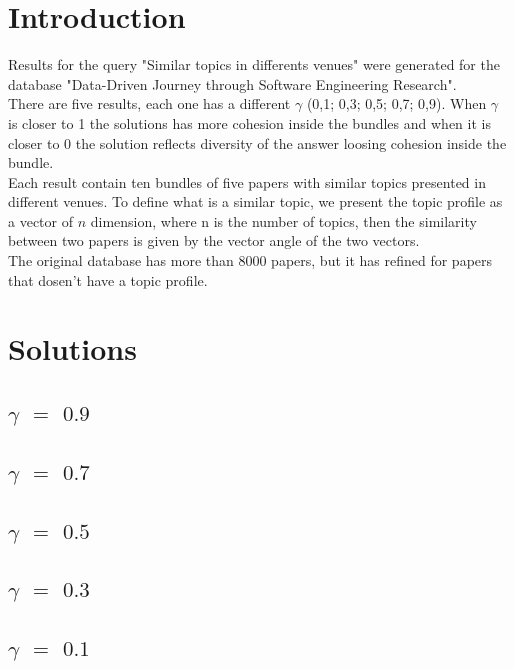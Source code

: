 \section{Introduction}
Results for the query "Similar topics in differents venues" were generated for the database 
"Data-Driven Journey through Software Engineering Research".\\
There are five results, each one has a different $\gamma$ (0,1; 0,3; 0,5; 0,7; 0,9). When $\gamma$ 
is closer to 1 the solutions has more cohesion inside the bundles and when it is closer to 0 the 
solution reflects diversity of the answer loosing cohesion inside the bundle.\\
Each result contain ten bundles of five papers with similar topics presented in different venues.
To define what is a similar topic, we present the topic profile as a vector of $n$ dimension, where 
n is the number of topics, then the similarity between two papers is given by the vector angle of 
the two vectors.\\
The original database has more than 8000 papers, but it has refined for papers that dosen't have a 
topic profile.

\cleardoublepage
\section{Solutions}
\subsection{$\gamma$ $=$ $0.9$}


\cleardoublepage
\subsection{$\gamma$ $=$ $0.7$}


\cleardoublepage
\subsection{$\gamma$ $=$ $0.5$}


\cleardoublepage
\subsection{$\gamma$ $=$ $0.3$}


\cleardoublepage
\subsection{$\gamma$ $=$ $0.1$}
